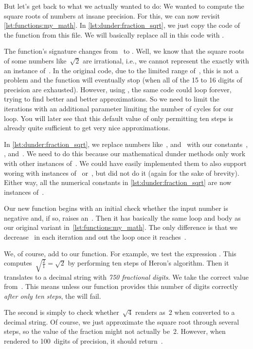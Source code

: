 But let's get back to what we actually wanted to do:
We wanted to compute the square roots of numbers at insane precision.
For this, we can now revisit \cref{lst:functions:my_math}.
In \cref{lst:dunder:fraction_sqrt}, we just copy the code of the  function from this file.
We will basically replace all  in this code with .%
%
\begin{sloppypar}%
The function's signature changes from~ to .
Well, we know that the square roots of some numbers like~$\sqrt{2}$ are irrational, i.e., we cannot represent the exactly with an instance of~.
In the original code, due to the limited range of~, this is not a problem and the function will eventually stop (when all of the 15 to 16 digits of precision are exhausted).
However, using , the same code could loop forever, trying to find better and better approximations.
So we need to limit the iterations with an additional parameter  limiting the number of cycles for our loop.
You will later see that this default value of only permitting ten steps is already quite sufficient to get very nice approximations.%
\end{sloppypar}%
%
In \cref{lst:dunder:fraction_sqrt}, we replace numbers like~,  and~ with our constants~, , and~.
We need to do this because our mathematical dunder methods only work with other instances of~.
We could have easily implemented them to also support woring with instances of~ or~, but did not do it (again for the sake of brevity).
Either way, all the numerical constants in \cref{lst:dunder:fraction_sqrt} are now instances of~.

Our new function begins with an initial check whether the input number is negative and, if so, raises an~.
Then it has basically the same loop and body as our original variant in~\cref{lst:functions:my_math}.
The only difference is that we decrease~ in each iteration and  out the loop once it reaches~.%
%
\begin{sloppypar}%
We, of course, add  to our function.
For example, we test the expression .
This computes~$\sqrt{\frac{2}{1}}=\sqrt{2}$ by performing ten steps of Heron's algorithm.
Then it translates to a decimal string with \emph{750 fractional digits}.
We take the correct value from~\cite{S2024DEOSRO2,NB1997TSROTT1MD}.
This means unless our function provides this number of digits correctly \emph{after only ten steps}, the  will fail.%
\end{sloppypar}%
%
The second  is simply to check whether~$\sqrt{4}$ renders as~2 when converted to a decimal string.
Of course, we just approximate the square root through several steps, so the value of the fraction might not actually be~2.
However, when rendered to 100~digits of precision, it should return~.

